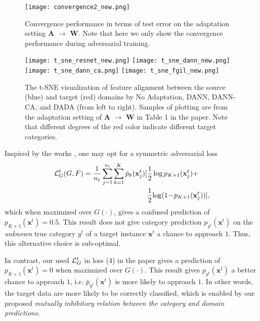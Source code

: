 \documentclass[letterpaper]{article} \usepackage{aaai20}  \usepackage{times}  \usepackage{helvet} \usepackage{courier}  \usepackage[hyphens]{url}  \usepackage{graphicx} \urlstyle{rm} \def\UrlFont{\rm}  \usepackage{graphicx}  \frenchspacing  \setlength{\pdfpagewidth}{8.5in}  \setlength{\pdfpageheight}{11in}
\begin{document}
\begin{figure}[!ht]
	\begin{center} 
\texttt{[image: convergence2\_new.png]}
	\end{center}
	\caption{Convergence performance in terms of test error on the adaptation setting \textbf{A} $\rightarrow$ \textbf{W}. Note that here we only show the convergence performance during adversarial training.}
	\label{fig:convergence_fg_variants}
\end{figure}

\begin{figure*}[ht]
	\texttt{[image: t\_sne\_resnet\_new.png]} \hfill  \texttt{[image: t\_sne\_dann\_new.png]} \hfill \texttt{[image: t\_sne\_dann\_ca.png]} \hfill  \texttt{[image: t\_sne\_fgil\_new.png]} \\
	\caption{ The t-SNE visualization of feature alignment between the source (blue) and target (red) domains by No Adaptation, DANN, DANN-CA, and DADA (from left to right). Samples of plotting are from the adaptation setting of \textbf{A} $\rightarrow$ \textbf{W} in Table 1 in the paper. Note that different degrees of the red color indicate different target categories.}  
	\label{fig:t_sne}  
\end{figure*}

Inspired by the works \cite{simultaneous_transfer,symnets}, one may opt for a symmetric adversarial loss
\begin{eqnarray}\label{EqnAdversarialConfusionLossOnTarget}
\begin{aligned}
{\cal{L}}_{G}^t (G, F) =  \frac{1}{n_t} \sum_{j=1}^{n_t} \sum_{k=1}^K \bar{p}_k(\mathbf{x}_j^t)[&\frac{1}{2} \log p_{K+1}(\mathbf{x}_j^t) + \\ &\frac{1}{2}\! \log(1\!-\!p_{K+1}(\mathbf{x}_j^t))] ,
\end{aligned}
\end{eqnarray}
which when maximized over $G(\cdot)$, gives a confused prediction of $p_{K+1}(\mathbf{x}^t) = 0.5$. This result does not give category prediction $p_{y^t}(\mathbf{x}^t)$ on the \emph{unknown} true category $y^t$ of a target instance $\mathbf{x}^t$ a chance to approach $1$. Thus, this alternative choice is sub-optimal. 

In contrast, our used ${\cal{L}}_G^t$ in loss (4) in the paper gives a prediction of $p_{K+1}(\mathbf{x}^t) = 0$ when maximized over $G(\cdot)$. This result gives $p_{y^t}(\mathbf{x}^t)$ a better chance to approach $1$, i.e. $\bar{p}_{y^t}(\mathbf{x}^t)$ is more likely to approach $1$. In other words, the target data are more likely to be correctly classified, which is enabled by our proposed \emph{mutually inhibitory relation between the category and domain predictions}. 
\end{document}
